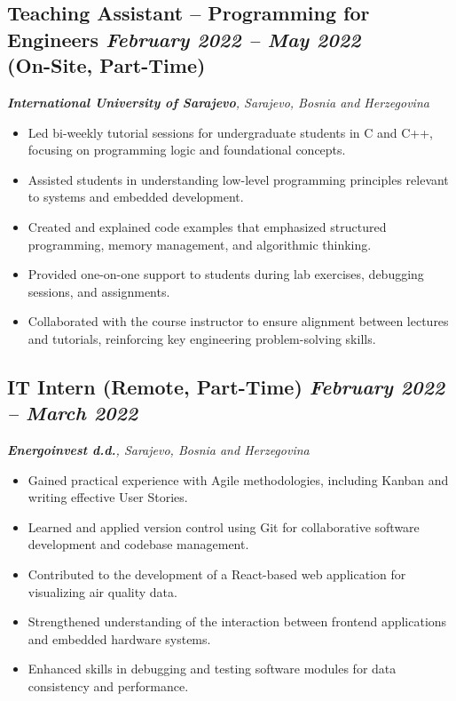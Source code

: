 \subsection*{\textbf{Teaching Assistant – Programming for Engineers} \hfill \textit{February 2022 -- May 2022}\\{(On-Site, Part-Time)}} 
\noindent\textit{\textbf{International University of Sarajevo}, Sarajevo, Bosnia and Herzegovina} 
\begin{itemize}[leftmargin=*,noitemsep,topsep=3pt]
    \item Led bi-weekly tutorial sessions for undergraduate students in C and C++, focusing on programming logic and foundational concepts.
    \item Assisted students in understanding low-level programming principles relevant to systems and embedded development.
    \item Created and explained code examples that emphasized structured programming, memory management, and algorithmic thinking.
    \item Provided one-on-one support to students during lab exercises, debugging sessions, and assignments.
    \item Collaborated with the course instructor to ensure alignment between lectures and tutorials, reinforcing key engineering problem-solving skills.
\end{itemize}
\vspace{20pt}


\subsection*{\textbf{IT Intern (Remote, Part-Time)} \hfill \textit{February 2022 -- March 2022}}  
\noindent\textit{\textbf{Energoinvest d.d.}, Sarajevo, Bosnia and Herzegovina} 
\begin{itemize}[leftmargin=*,noitemsep,topsep=3pt]
    \item Gained practical experience with Agile methodologies, including Kanban and writing effective User Stories.
    \item Learned and applied version control using Git for collaborative software development and codebase management.
    \item Contributed to the development of a React-based web application for visualizing air quality data.
    \item Strengthened understanding of the interaction between frontend applications and embedded hardware systems.
    \item Enhanced skills in debugging and testing software modules for data consistency and performance.
\end{itemize}
\vspace{20pt}